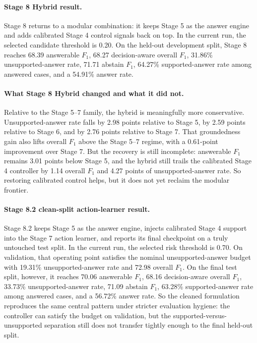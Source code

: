\paragraph{Stage 8 Hybrid result.}
Stage 8 returns to a modular combination:
it keeps Stage 5 as the answer engine and adds calibrated Stage 4 control
signals back on top.
In the current run, the selected candidate threshold is 0.20.
On the held-out development split, Stage 8 reaches 68.39 answerable $F_1$,
68.27 decision-aware overall $F_1$, 31.86\% unsupported-answer rate, 71.71
abstain $F_1$, 64.27\% supported-answer rate among answered cases, and a
54.91\% answer rate.

\paragraph{What Stage 8 Hybrid changed and what it did not.}
Relative to the Stage 5--7 family, the hybrid is meaningfully more
conservative.
Unsupported-answer rate falls by 2.98 points relative to Stage 5, by
2.59 points relative to Stage 6, and by 2.76 points relative to Stage 7.
That groundedness gain also lifts overall $F_1$ above the Stage 5--7 regime,
with a 0.61-point improvement over Stage 7.
But the recovery is still incomplete:
answerable $F_1$ remains 3.01 points below Stage 5, and the hybrid still
trails the calibrated Stage 4 controller by 1.14 overall $F_1$ and 4.27 points
of unsupported-answer rate.
So restoring calibrated control helps, but it does not yet reclaim the modular
frontier.

\paragraph{Stage 8.2 clean-split action-learner result.}
Stage 8.2 keeps Stage 5 as the answer engine, injects calibrated Stage 4
support into the Stage 7 action learner, and reports its final checkpoint on a
truly untouched test split.
In the current run, the selected risk threshold is 0.70.
On validation, that operating point satisfies the nominal unsupported-answer
budget with 19.31\% unsupported-answer rate and 72.98 overall $F_1$.
On the final test split, however, it reaches 70.06 answerable $F_1$,
68.16 decision-aware overall $F_1$, 33.73\% unsupported-answer rate, 71.09
abstain $F_1$, 63.28\% supported-answer rate among answered cases, and a
56.72\% answer rate.
So the cleaned formulation reproduces the same central pattern under stricter
evaluation hygiene:
the controller can satisfy the budget on validation, but the
supported-versus-unsupported separation still does not transfer tightly enough
to the final held-out split.

